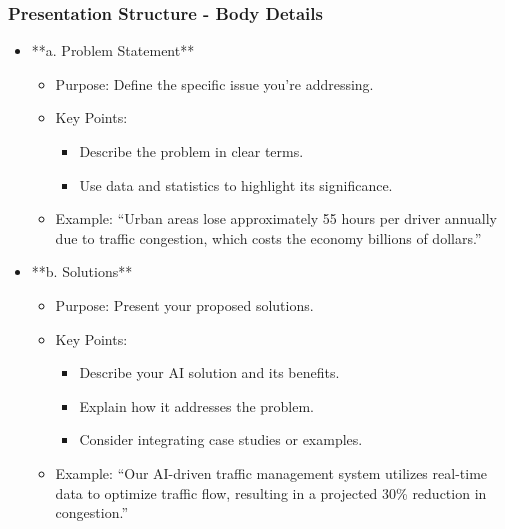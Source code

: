 \documentclass[aspectratio=169]{beamer}
\begin{document}
\begin{frame}[fragile]
    \frametitle{Presentation Structure - Body Details}
    \begin{itemize}
        \item **a. Problem Statement**
            \begin{itemize}
                \item Purpose: Define the specific issue you're addressing.
                \item Key Points:
                    \begin{itemize}
                        \item Describe the problem in clear terms.
                        \item Use data and statistics to highlight its significance.
                    \end{itemize}
                \item Example: ``Urban areas lose approximately 55 hours per driver annually due to traffic congestion, which costs the economy billions of dollars.''
            \end{itemize}
        
        \item **b. Solutions**
            \begin{itemize}
                \item Purpose: Present your proposed solutions.
                \item Key Points:
                    \begin{itemize}
                        \item Describe your AI solution and its benefits.
                        \item Explain how it addresses the problem.
                        \item Consider integrating case studies or examples.
                    \end{itemize}
                \item Example: ``Our AI-driven traffic management system utilizes real-time data to optimize traffic flow, resulting in a projected 30\% reduction in congestion.''
            \end{itemize}
        

\end{itemize}
\end{frame}
\end{document}
